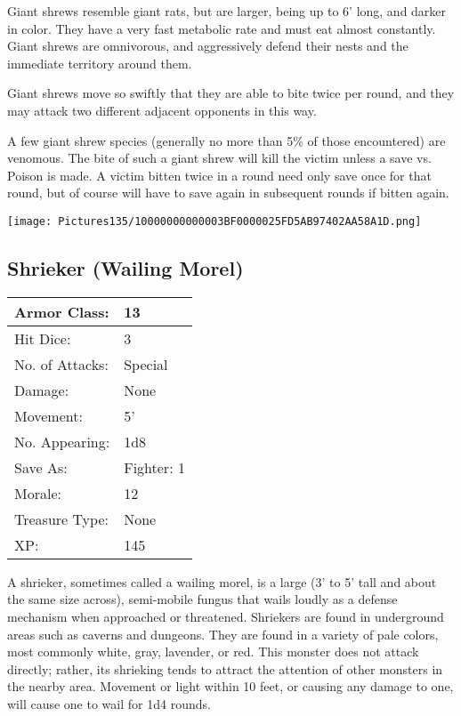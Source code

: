 \documentclass[a4paper,twoside,openany,10pt]{book}
\begin{document}
\begin{multicols}{2}
Giant shrews resemble giant rats, but are larger, being up to 6' long, and darker in color. They have a very fast metabolic rate and must eat almost constantly. Giant shrews are omnivorous, and aggressively defend their nests and the immediate territory around them.

Giant shrews move so swiftly that they are able to bite twice per round, and they may attack two different adjacent opponents in this way.

A few giant shrew species (generally no more than 5\% of those encountered) are venomous. The bite of such a giant shrew will kill the victim unless a save vs. Poison is made. A victim bitten twice in a round need only save once for that round, but of course will have to save again in subsequent rounds if bitten again.

\begin{center} \texttt{[image: Pictures135/10000000000003BF0000025FD5AB97402AA58A1D.png]} \end{center}


\subsection*{Shrieker (Wailing Morel)}\label{shrieker-wailing-morel}

\begin{tabularx}{0.50\textwidth}{@{}lX@{}}
Armor Class: & 13 \\\hline
Hit Dice: & 3 \\\hline
No. of Attacks: & Special \\\hline
Damage: & None \\\hline
Movement: & 5' \\\hline
No. Appearing: & 1d8 \\\hline
Save As: & Fighter: 1 \\\hline
Morale: & 12 \\\hline
Treasure Type: & None \\\hline
XP: & 145 \\\hline
\end{tabularx}\medskip

A shrieker, sometimes called a wailing morel,\textbf{ }is a large (3' to 5' tall and about the same size across), semi-mobile fungus that wails loudly as a defense mechanism when approached or threatened. Shriekers are found in underground areas such as caverns and dungeons. They are found in a variety of pale colors, most commonly white, gray, lavender, or red.  This monster does not attack directly; rather, its shrieking tends to attract the attention of other monsters in the nearby area. Movement or light within 10 feet, or causing any damage to one, will cause one to wail for 1d4 rounds.


\end{multicols}
\end{document}
